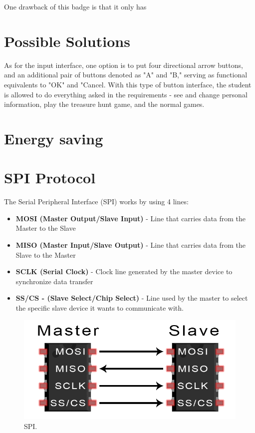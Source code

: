 \documentclass[portuguese]{ist-thesis}
\begin{document}
One drawback of this badge is that it only has

\section{Possible Solutions}

As for the input interface, one option is to put four directional arrow buttons, and an additional pair of buttons denoted as "A" and "B," serving as functional equivalents to "OK" and "Cancel. With this type of button interface, the student is allowed to do everything asked in the requirements - see and change personal information, play the treasure hunt game, and the normal games. 

\section{Energy saving}



\section{SPI Protocol}

The Serial Peripheral Interface (SPI) works by using 4 lines:

\begin{itemize}
  \item \textbf{MOSI (Master Output/Slave Input)} - Line that carries data from the Master to the Slave
  \item \textbf{MISO (Master Input/Slave Output)} - Line that carries data from the Slave to the Master
  \item \textbf{SCLK (Serial Clock)} - Clock line generated by the master device to synchronize data transfer
  \item \textbf{SS/CS - (Slave Select/Chip Select)} - Line used by the master to select the specific slave device it wants to communicate with.
\end{itemize}

\begin{figure}[ht]
	\centering
	\includegraphics[width = 0.5\linewidth]{images/protocolos/SPI_master_slave.png}
	\caption{SPI.}
	\label{fig:spi}
\end{figure}
\end{document}
